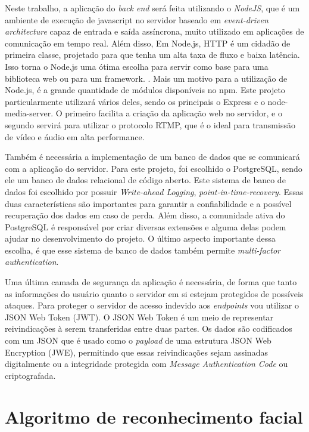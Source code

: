 \documentclass[12pt, %
openright, 
oneside, %
a4paper,    %
brazil]{facom-ufu-abntex2}
\begin{document}
Neste trabalho, a aplicação do \emph{back end} será feita utilizando o
\emph{NodeJS}, que é um ambiente de execução de javascript no servidor baseado
em \emph{event-driven architecture} capaz de entrada e saída assíncrona, muito
utilizado em aplicações de comunicação em tempo real. \cite{aboutnodejs} Além
disso, Em Node.js, HTTP é um cidadão de primeira classe, projetado para que
tenha um alta taxa de fluxo e baixa latência. Isso torna o Node.js uma ótima
escolha para servir como base para uma biblioteca web ou para um framework.
\cite{NodeJSaboutoriginal}. Mais um motivo para a utilização de Node.js, é a
grande quantidade de módulos disponíveis no npm. Este projeto particularmente
utilizará vários deles, sendo os principais o Express e o node-media-server. O
primeiro facilita a criação da aplicação web no servidor, e o segundo servirá
para utilizar o protocolo RTMP, que é o ideal para transmissão de vídeo e áudio
em alta performance.

Também é necessária a implementação de um banco de dados que se comunicará com
a aplicação do servidor. Para este projeto, foi escolhido o PostgreSQL, sendo
ele um banco de dados relacional de código aberto. Este sistema de banco de
dados foi escolhido por possuir \emph{Write-ahead Logging},
\emph{point-in-time-recovery}. Essas duas características são importantes para
garantir a confiabilidade e a possível recuperação dos dados em caso de perda.
Além disso, a comunidade ativa do PostgreSQL é responsável por criar diversas
extensões e alguma delas podem ajudar no desenvolvimento do projeto. O último
aspecto importante dessa escolha, é que esse sistema de banco de dados também
permite \emph{multi-factor authentication}. \cite{aboutPostgre}

Uma última camada de segurança da aplicação é necessária, de forma que tanto as
informações do usuário quanto o servidor em si estejam protegidos de possíveis
ataques. Para proteger o servidor de acesso indevido aos \emph{endpoints} vou
utilizar o JSON Web Token (JWT). O JSON Web Token é um meio de representar
reivindicações à serem transferidas entre duas partes. Os dados são codificados
com um JSON que é usado como o \emph{payload} de uma estrutura JSON Web
Encryption (JWE), permitindo que essas reivindicações sejam assinadas
digitalmente ou a integridade protegida com \emph{Message Authentication Code}
ou criptografada. \cite{jsonwebtoken}

\section{Algoritmo de reconhecimento facial}
\end{document}
